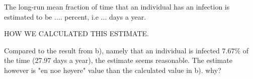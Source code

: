 The long-run mean fraction of time that an individual has an infection is estimated to be .... percent, i.e ... days a year.  

HOW WE CALCULATED THIS ESTIMATE.

Compared to the result from b), namely that an individual is infected $7.67\%$ of the time  (27.97 days a year), the estimate seems reasonable. The estimate however is "en noe høyere" value than the calculated value in b). why?



